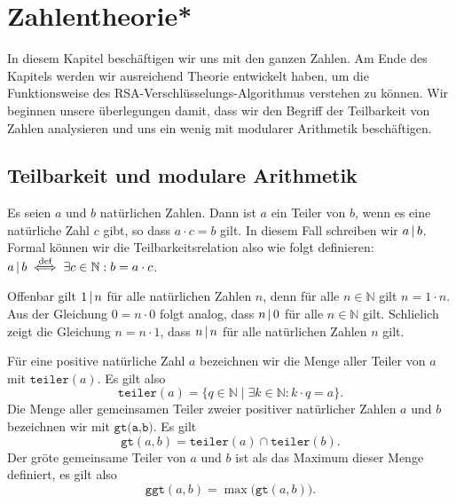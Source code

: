 \chapter{Zahlentheorie*}
In diesem Kapitel besch\"{a}ftigen wir uns mit den ganzen Zahlen.  Am Ende des Kapitels werden
wir ausreichend Theorie entwickelt haben, um die Funktionsweise des
RSA-Verschl\"{u}sselungs-Algorithmus verstehen zu k\"{o}nnen.  
Wir beginnen unsere \"{u}berlegungen damit, dass wir den Begriff der Teilbarkeit von Zahlen
analysieren und uns ein wenig mit modularer Arithmetik besch\"{a}ftigen.

\section{Teilbarkeit und modulare Arithmetik}

\begin{Definition}[Teiler]
  Es seien $a$ und $b$ nat\"{u}rlichen Zahlen.  Dann ist $a$ ein Teiler von $b$, wenn es eine
  nat\"{u}rliche Zahl $c$ gibt, so dass $a \cdot c = b$ gilt.  In diesem Fall schreiben wir $a \,|\, b$.
  Formal k\"{o}nnen wir die Teilbarkeitsrelation also wie folgt definieren:
  \\[0.2cm]
  \hspace*{1.3cm}
  $a \,|\, b \;\stackrel{\mbox{\scriptsize def}}{\Longleftrightarrow}\; \exists c \in \mathbb{N}: b = a \cdot c$.
\end{Definition}

\remark
Offenbar gilt $1 \,|\, n$ f\"{u}r alle nat\"{u}rlichen Zahlen $n$, denn f\"{u}r alle $n \in \mathbb{N}$ gilt 
$n = 1 \cdot n$.   Aus der Gleichung $0 = n \cdot 0$ folgt analog, dass $n \,|\, 0$ f\"{u}r alle 
$n \in \mathbb{N}$ gilt.  Schlie\3lich zeigt die Gleichung $n = n \cdot 1$, dass $n \,|\, n$
f\"{u}r alle nat\"{u}rlichen Zahlen $n$ gilt.
\vspace*{0.3cm}

F\"{u}r eine positive nat\"{u}rliche Zahl $a$ bezeichnen wir die Menge aller Teiler von $a$ mit
$\texttt{teiler}(a)$.  Es gilt also
\[ \texttt{teiler}(a) = \{ q \in \mathbb{N} \mid \exists k \in \mathbb{N}: k \cdot q = a \}. \]
Die Menge aller gemeinsamen Teiler zweier positiver nat\"{u}rlicher Zahlen
$a$ und $b$ bezeichnen wir mit $\texttt{gt(a,b)}$.  Es gilt
\[ \texttt{gt}(a,b) = \texttt{teiler}(a) \cap \texttt{teiler}(b). \]
Der gr\"{o}\3te gemeinsame Teiler von $a$ und $b$ ist als das Maximum dieser Menge definiert,
es gilt also 
\[ \texttt{ggt}(a,b) = \max\bigl(\texttt{gt}(a,b)\bigr). \]

